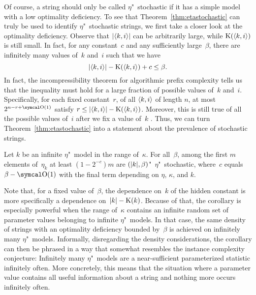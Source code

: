 Of course, a string should only be called $\eta$"~stochastic if it has a simple model with a low optimality deficiency.
To see that Theorem~\ref{thm:etastochastic} can truly be used to identify $\eta$"~stochastic strings, we first take a closer look at the optimality deficiency.
Observe that ${\lvert{\langle k, i\rangle}\rvert}$ can be arbitrarily large, while $\operatorname{K}({\langle k, i\rangle})$ is still small.
In fact, for any constant~$c$ and any sufficiently large~$\beta$, there are infinitely many values of~$k$ and~$i$ such that we have
\begin{equation*}
  {\lvert{\langle k, i\rangle}\rvert} - \operatorname{K}({\langle k, i\rangle}) + c \le \beta.
\end{equation*}
In fact, the incompressibility theorem for algorithmic prefix complexity \parencite[][Theorem~3.3.1(ii)]{li2008introduction} tells us that the inequality must hold for a large fraction of possible values of~$k$ and~$i$.
Specifically, for each fixed constant~$r$, of all ${\langle k, i\rangle}$ of length $n$, at most $2^{n - r + \bigO(1)}$ satisfy $r \le {\lvert{\langle k, i\rangle}\rvert} - \operatorname{K}({\langle k, i\rangle})$.
Moreover, this is still true of all the possible values of~$i$ after we fix a value of~$k$ \parencite[][Theorem~3.9.1]{li2008introduction}.
Thus, we can turn Theorem~\ref{thm:etastochastic} into a statement about the prevalence of stochastic strings.
\begin{corollary}
\label{cor:stochastic}%
  Let $k$ be an infinite $\eta$"~model in the range of~$\kappa$.
  For all~$\beta$, among the first $m$ elements of~$\eta_k$ at least $(1 - 2^{-c})m$ are $({\lvert k\rvert}, \beta)$"~$\eta$"~stochastic, where~$c$ equals $\beta - \bigO(1)$ with the final term depending on $\eta$, $\kappa$, and $k$.
\end{corollary}
Note that, for a fixed value of~$\beta$, the dependence on~$k$ of the hidden constant is more specifically a dependence on~${\lvert k\rvert} - \operatorname{K}(k)$.
Because of that, the corollary is especially powerful when the range of~$\kappa$ contains an infinite random set of parameter values belonging to infinite $\eta$"~models.
In that case, the same density of strings with an optimality deficiency bounded by~$\beta$ is achieved on infinitely many $\eta$"~models.
Informally, disregarding the density considerations, the corollary can then be phrased in a way that somewhat resembles the instance complexity conjecture:
Infinitely many $\eta$"~models are a near-sufficient parameterized statistic infinitely often.
More concretely, this means that the situation where a parameter value contains all useful information about a string and nothing more occurs infinitely often.

